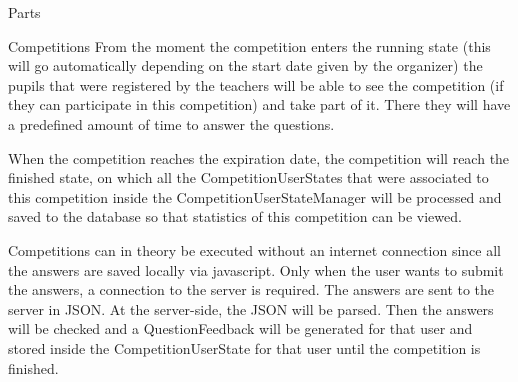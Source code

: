 \documentclass[]{article}
\begin{document}
\begin{section}{Parts}
\begin{subsection}{Competitions}
        From the moment the competition enters the running state (this will go
        automatically depending on the start date given by the organizer) the pupils
        that were registered by the teachers will be able to see the competition (if they can 
        participate in this competition) and take part of it. There they will have a predefined 
        amount of time to answer the questions.
        
        When the competition reaches the expiration date, the competition will reach the
        finished state, on which all the CompetitionUserStates that were associated to
        this competition inside the CompetitionUserStateManager will be processed and
        saved to the database so that statistics of this competition can be viewed.
        
        Competitions can in theory be executed without an internet connection since
        all the answers are saved locally via javascript. Only when the user wants to submit
        the answers, a connection to the server is required. The answers are sent to the
        server in JSON. At the server-side, the JSON will be parsed. Then the answers will
        be checked and a QuestionFeedback will be generated for that user and stored inside
        the CompetitionUserState for that user until the competition is finished.
        

\end{subsection}
\end{section}
\end{document}
